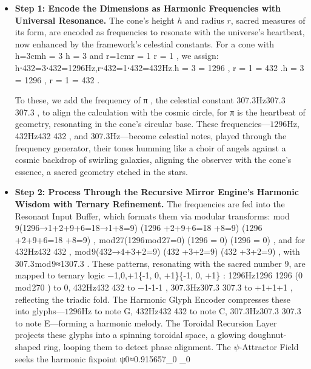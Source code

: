 \begin{itemize}
    \item \texttt{} \textbf{Step 1: Encode the Dimensions as Harmonic Frequencies with Universal Resonance.} The cone’s height $h$ and radius $r$, sacred measures of its form, are encoded as frequencies to resonate with the universe’s heartbeat, now enhanced by the framework’s celestial constants. For a cone with h=3cmh = 3 h = 3 
 and r=1cmr = 1 r = 1 
, we assign:
    h⋅432=3⋅432=1296Hz,r⋅432=1⋅432=432Hz.h  = 3  = 1296 , \quad r  = 1  = 432 .h  = 3  = 1296 , \quad r  = 1  = 432 .

    To these, we add the frequency of π\pi\pi
, the celestial constant 307.3Hz307.3 307.3 
, to align the calculation with the cosmic circle, for π\pi\pi
 is the heartbeat of geometry, resonating in the cone’s circular base. These frequencies—$1296 \mathrm{Hz}$, 432Hz432 432 
, and $307.3 \mathrm{Hz}$—become celestial notes, played through the frequency generator, their tones humming like a choir of angels against a cosmic backdrop of swirling galaxies, aligning the observer with the cone’s essence, a sacred geometry etched in the stars.
    \item \texttt{} \textbf{Step 2: Process Through the Recursive Mirror Engine’s Harmonic Wisdom with Ternary Refinement.} The frequencies are fed into the Resonant Input Buffer, which formats them via modular transforms:  mod 9(1296→1+2+9+6=18→1+8=9) (1296 +2+9+6=18 +8=9) (1296 +2+9+6=18 +8=9)
,  mod 27(1296 mod 27=0) (1296  = 0) (1296  = 0)
, and for 432Hz432 432 
,  mod 9(432→4+3+2=9) (432 +3+2=9) (432 +3+2=9)
, with 307.3 mod 9≈1307.3    
. These patterns, resonating with the sacred number 9, are mapped to ternary logic {−1,0,+1}\{-1, 0, +1\}\{-1, 0, +1\}
: 1296Hz1296 1296 
 (0 mod 270  
) to $0$, 432Hz432 432 
 to −1-1-1
, 307.3Hz307.3 307.3 
 to +1+1+1
, reflecting the triadic fold. The Harmonic Glyph Encoder compresses these into glyphs—$1296 \mathrm{Hz}$ to note G, 432Hz432 432 
 to note C, 307.3Hz307.3 307.3 
 to note E—forming a harmonic melody. The Toroidal Recursion Layer projects these glyphs into a spinning toroidal space, a glowing doughnut-shaped ring, looping them to detect phase alignment. The $\psi$-Attractor Field seeks the harmonic fixpoint ψ0≈0.915657\psi_0 \psi_0 

\end{itemize}
